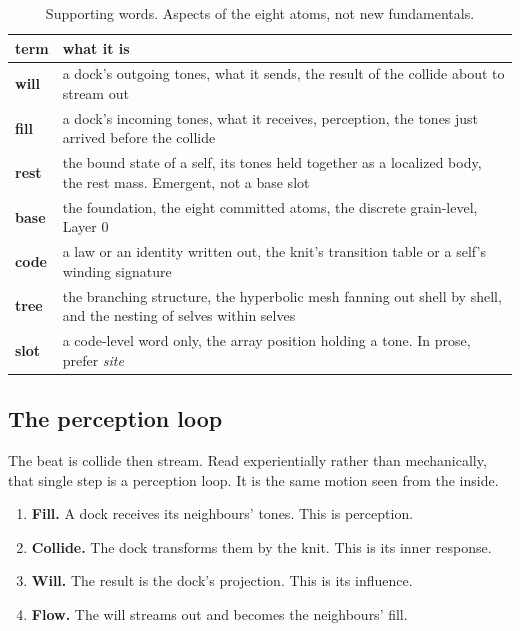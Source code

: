 \begin{table}[ht]
\centering
\begin{tabular}{@{}lp{}@{}}
\toprule
term & what it is \\
\midrule
\textbf{will} & a dock's outgoing tones, what it sends, the result of the collide about to stream out \\
\textbf{fill} & a dock's incoming tones, what it receives, perception, the tones just arrived before the collide \\
\textbf{rest} & the bound state of a self, its tones held together as a localized body, the rest mass. Emergent, not a base slot \\
\textbf{base} & the foundation, the eight committed atoms, the discrete grain-level, Layer $0$ \\
\textbf{code} & a law or an identity written out, the knit's transition table or a self's winding signature \\
\textbf{tree} & the branching structure, the hyperbolic mesh fanning out shell by shell, and the nesting of selves within selves \\
\textbf{slot} & a code-level word only, the array position holding a tone. In prose, prefer \emph{site} \\
\bottomrule
\end{tabular}
\caption{Supporting words. Aspects of the eight atoms, not new fundamentals.}
\label{tab:supporting}
\end{table}

\subsection{The perception loop}

The beat is collide then stream. Read experientially rather than mechanically, that single step is a perception loop. It is the same motion seen from the inside.

\begin{enumerate}
\item \textbf{Fill.} A dock receives its neighbours' tones. This is perception.
\item \textbf{Collide.} The dock transforms them by the knit. This is its inner response.
\item \textbf{Will.} The result is the dock's projection. This is its influence.
\item \textbf{Flow.} The will streams out and becomes the neighbours' fill.
\end{enumerate}

